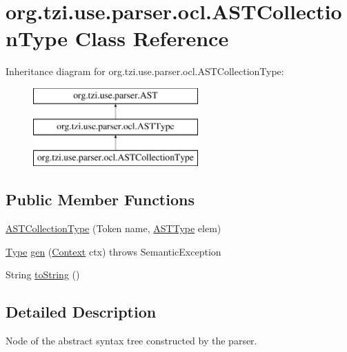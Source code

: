 \hypertarget{classorg_1_1tzi_1_1use_1_1parser_1_1ocl_1_1_a_s_t_collection_type}{\section{org.\-tzi.\-use.\-parser.\-ocl.\-A\-S\-T\-Collection\-Type Class Reference}
\label{classorg_1_1tzi_1_1use_1_1parser_1_1ocl_1_1_a_s_t_collection_type}
}
Inheritance diagram for org.\-tzi.\-use.\-parser.\-ocl.\-A\-S\-T\-Collection\-Type\-:\begin{figure}[H]
\begin{center}
\leavevmode
\includegraphics[height=3.000000cm]{classorg_1_1tzi_1_1use_1_1parser_1_1ocl_1_1_a_s_t_collection_type}
\end{center}
\end{figure}
\subsection*{Public Member Functions}
\begin{DoxyCompactItemize}
\item 
\hyperlink{classorg_1_1tzi_1_1use_1_1parser_1_1ocl_1_1_a_s_t_collection_type_acb0dfcebfe8c0addfa73359f51e466fb}{A\-S\-T\-Collection\-Type} (Token name, \hyperlink{classorg_1_1tzi_1_1use_1_1parser_1_1ocl_1_1_a_s_t_type}{A\-S\-T\-Type} elem)
\item 
\hyperlink{interfaceorg_1_1tzi_1_1use_1_1uml_1_1ocl_1_1type_1_1_type}{Type} \hyperlink{classorg_1_1tzi_1_1use_1_1parser_1_1ocl_1_1_a_s_t_collection_type_a97df7f372ca797b37ae7b323012edb33}{gen} (\hyperlink{classorg_1_1tzi_1_1use_1_1parser_1_1_context}{Context} ctx)  throws Semantic\-Exception 
\item 
String \hyperlink{classorg_1_1tzi_1_1use_1_1parser_1_1ocl_1_1_a_s_t_collection_type_a8bdec6c43059a69709fb1dc79a74f2ca}{to\-String} ()
\end{DoxyCompactItemize}


\subsection{Detailed Description}
Node of the abstract syntax tree constructed by the parser.

